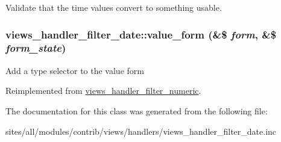 Validate that the time values convert to something usable. \hypertarget{classviews__handler__filter__date_5c7fb298feef092a2cb3bc3f75f54f29}{
\subsubsection[{value\_\-form}]{\setlength{\rightskip}{0pt plus 5cm}views\_\-handler\_\-filter\_\-date::value\_\-form (\&\$ {\em form}, \/  \&\$ {\em form\_\-state})}}
\label{classviews__handler__filter__date_5c7fb298feef092a2cb3bc3f75f54f29}


Add a type selector to the value form 

Reimplemented from \hyperlink{classviews__handler__filter__numeric_b0888218590f7c620f10fc04a98d135e}{views\_\-handler\_\-filter\_\-numeric}.

The documentation for this class was generated from the following file:\begin{CompactItemize}
\item 
sites/all/modules/contrib/views/handlers/views\_\-handler\_\-filter\_\-date.inc\end{CompactItemize}
